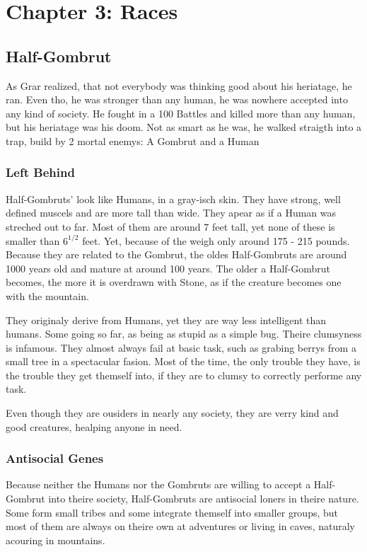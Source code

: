 \chapter{Chapter 3: Races}
\section{Half-Gombrut}
\begin{quotebox}
As Grar realized, that not everybody was thinking good about his heriatage, he ran. Even tho, he was  stronger than any human, he was nowhere accepted into any kind of  society. He fought in a 100 Battles and killed more than any human, but his heriatage was his doom. Not as smart as he was, he walked straigth into a trap, build by 2 mortal enemys: A Gombrut and a Human
\end{quotebox}

\subsection{Left Behind}
Half-Gombruts' look like Humans, in a gray-isch skin. They have strong, well defined muscels and are more tall than wide. They apear as if a Human was streched out to far. Most of them are around 7 feet tall, yet none of these is smaller  than $6^{1/2}$ feet. Yet, because of the weigh only around 175 - 215 pounds. Because they are related to the Gombrut, the oldes Half-Gombruts are around 1000 years old and mature at around 100 years. The older a Half-Gombrut becomes, the more it is overdrawn with Stone, as if the creature becomes one with the mountain.

They originaly derive from Humans, yet they are way less intelligent than humans. Some going so far, as being as stupid as a simple bug. Theire clumsyness is infamous. They almost always fail at basic task, such as grabing berrys from a small tree in a spectacular fasion. Most of the time, the only trouble they have, is the trouble they get themself into, if they are to clumsy to correctly performe any task.

Even though they are ousiders in nearly any society, they are verry kind and good creatures, healping anyone in need.

\newpage

\subsection{Antisocial Genes}
Because neither the Humans nor the Gombruts are willing to accept a Half-Gombrut into theire society, Half-Gombruts are antisocial loners in theire nature. Some form small tribes and some integrate themself into smaller groups, but most of them are always on theire own at adventures or living in caves, naturaly acouring in mountains.

